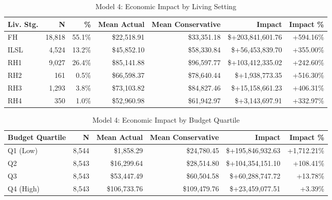 \begin{table}[htbp]
\centering
\small
\caption{Model 4: Economic Impact by Living Setting}
\label{tab:model4_impact_living}
\begin{tabular}{lrrrrrr}
\toprule
\textbf{Liv. Stg.} & \textbf{N} & \textbf{\%} & \textbf{Mean Actual} & \textbf{Mean Conservative} & \textbf{Impact} & \textbf{Impact \%} \\
\midrule
FH & 18,818 & 55.1\% & \$22,518.91 & \$33,351.18 & \$+203,841,601.76 & +594.16\% \\
ILSL & 4,524 & 13.2\% & \$45,852.10 & \$58,330.84 & \$+56,453,839.70 & +355.00\% \\
RH1 & 9,027 & 26.4\% & \$85,141.88 & \$96,597.77 & \$+103,412,335.02 & +242.60\% \\
RH2 & 161 & 0.5\% & \$66,598.37 & \$78,640.44 & \$+1,938,773.35 & +516.30\% \\
RH3 & 1,293 & 3.8\% & \$73,103.82 & \$84,827.46 & \$+15,158,661.23 & +406.31\% \\
RH4 & 350 & 1.0\% & \$52,960.98 & \$61,942.97 & \$+3,143,697.91 & +332.97\% \\
\bottomrule
\end{tabular}
\end{table}

\begin{table}[htbp]
\centering
\small
\caption{Model 4: Economic Impact by Budget Quartile}
\label{tab:model4_impact_quartile}
\begin{tabular}{lrrrrr}
\toprule
\textbf{Budget Quartile} & \textbf{N} & \textbf{Mean Actual} & \textbf{Mean Conservative} & \textbf{Impact} & \textbf{Impact \%} \\
\midrule
Q1 (Low) & 8,544 & \$1,858.29 & \$24,780.45 & \$+195,846,932.63 & +1,712.21\% \\
Q2 & 8,543 & \$16,299.64 & \$28,514.80 & \$+104,354,151.10 & +108.41\% \\
Q3 & 8,543 & \$53,447.49 & \$60,504.58 & \$+60,288,747.72 & +13.78\% \\
Q4 (High) & 8,543 & \$106,733.76 & \$109,479.76 & \$+23,459,077.51 & +3.39\% \\
\bottomrule
\end{tabular}
\end{table}

